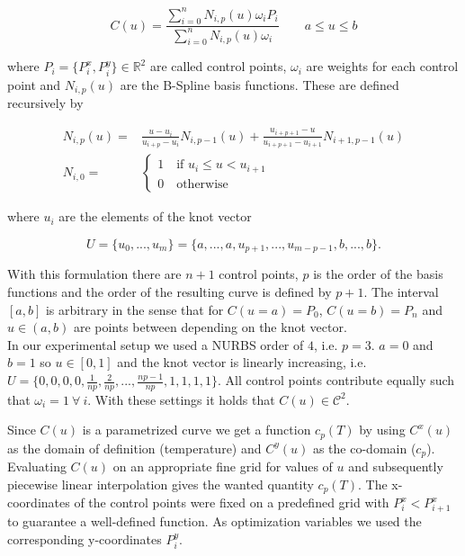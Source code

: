 \documentclass{scrartcl}[12pt, halfparskip]
\begin{document}
\begin{equation}
	C(u) = \frac{\sum_{i=0}^{n} N_{i,p}(u) \omega_i P_i }{\sum_{i=0}^{n} N_{i,p}(u) \omega_i} \qquad a \le u \le b
\end{equation}

where $P_i = \{ P_i^x, P_i^y \} \in \mathbb{R}^2$ are called control points, $\omega_i$ are weights for each control point and $N_{i,p}(u)$ are the B-Spline basis functions. These are defined recursively by

\begin{align}
	N_{i,p}(u) = & \frac{u - u_i}{u_{i+p} - u_i} N_{i,p-1}(u) + \frac{u_{i+p+1} - u}{u_{i+p+1} - u_{i+1}} N_{i+1,p-1}(u) \label{eq:NURBS_basis_polynomial} \\[1ex]
	N_{i,0} = &
	\begin{cases}
		1 \quad \text{if } u_i \le u < u_{i+1} \\
		0 \quad \text{otherwise}
	\end{cases} \nonumber
\end{align}

where $u_i$ are the elements of the knot vector

\begin{equation}
	U = \{u_0,...,u_m\}=\{a,...,a,u_{p+1},...,u_{m-p-1},b,...,b\}.
\end{equation}

With this formulation there are $n+1$ control points, $p$ is the order of the basis functions and the order of the resulting curve is defined by $p+1$. The interval $[a,b]$ is arbitrary in the sense that for $C(u=a)=P_0$,  $C(u=b)=P_n$ and $u \in (a,b)$ are points between depending on the knot vector.\\

In our experimental setup we used a NURBS order of $4$, i.e. $p=3$. $a=0$ and $b=1$ so $u \in [0,1]$ and the knot vector is linearly increasing, i.e. $U = \{ 0,0,0,0,\frac{1}{n p},\frac{2}{n p},...,\frac{n p - 1}{n p},1,1,1,1 \}$. All control points contribute equally such that $\omega_i=1 \ \forall \ i$. With these settings it holds that $C(u) \in \mathcal{C}^2$.

Since $C(u)$ is a parametrized curve we get a function $c_p(T)$ by using $C^x(u)$ as the domain of definition (temperature) and $C^y(u)$ as the co-domain ($c_p$). Evaluating $C(u)$ on an appropriate fine grid for values of $u$ and subsequently piecewise linear interpolation gives the wanted quantity $c_p(T)$.
The x-coordinates of the control points were fixed on a predefined grid with $P_i^x < P_{i+1}^x$ to guarantee a well-defined function.
As optimization variables we used the corresponding y-coordinates $P_i^y$.
\end{document}
